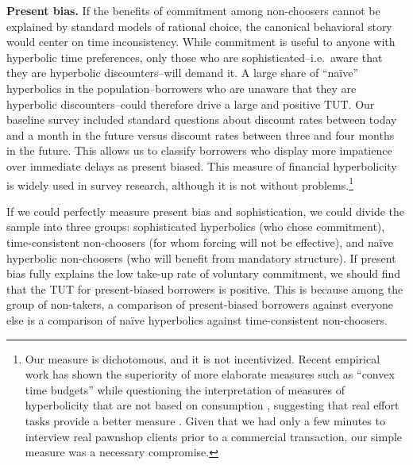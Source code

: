 \begin{appendix}
\noindent \textbf{Present bias.} If the benefits of commitment among non-choosers cannot be explained by standard models of rational choice, the canonical behavioral story would center on time inconsistency.  While commitment is useful to anyone with hyperbolic time preferences, only those who are sophisticated--i.e.\ aware that they are hyperbolic discounters--will demand it.  A large share of ``na\"ive'' hyperbolics in the population--borrowers who are unaware that they are hyperbolic discounters--could therefore drive a large and positive $\text{TUT}$.  Our baseline survey included standard questions about discount rates between today and a month in the future versus discount rates between three and four months in the future.
This allows us to classify borrowers who display more impatience over immediate delays as present biased. This measure of financial hyperbolicity is widely used in survey research, although it is not without problems.\footnote{Our measure is dichotomous, and it is not incentivized. Recent empirical work has shown the superiority of more elaborate measures such as ``convex time budgets'' \citep{andreoni2015measuring} while questioning the interpretation of measures of hyperbolicity that are not based on consumption \citep{andreoni2012estimating, cohen2020measuring}, suggesting that real effort tasks provide a better measure \citep{augenblick2015working}.  Given that we had only a few minutes to interview real pawnshop clients prior to a commercial transaction, our simple measure was a necessary compromise.}   

If we could perfectly measure present bias and sophistication, we could divide the sample into three groups: sophisticated hyperbolics (who chose commitment), time-consistent non-choosers (for whom forcing will not be effective), and na\"{i}ve hyperbolic non-choosers (who will benefit from mandatory structure). %
If present bias fully explains the low take-up rate of voluntary commitment, we should find that the TUT for present-biased borrowers is positive. This is because among the group of non-takers, a comparison of present-biased borrowers against everyone else is a comparison of na\"{i}ve hyperbolics against time-consistent non-choosers. 


\end{appendix}
